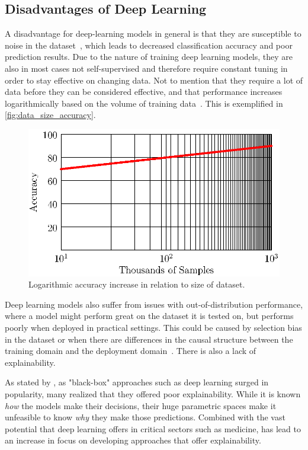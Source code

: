 \subsection{Disadvantages of Deep Learning}
A disadvantage for deep-learning models in general is that they are susceptible to noise in the dataset~\cite{noise1,noise2}, which leads to decreased classification accuracy and poor prediction results. Due to the nature of training deep learning models, they are also in most cases not self-supervised and therefore require constant tuning in order to stay effective on changing data. Not to mention that they require a lot of data before they can be considered effective, and that performance increases logarithmically based on the volume of training data~\cite{deeplearning_dataset}. This is exemplified in \autoref{fig:data_size_accuracy}.
\begin{figure}[htb]
    \centering
    \includegraphics[width=0.7\linewidth]{resources/related_works/training_volume}
    \caption[Dataset Volume Accuracy]{Logarithmic accuracy increase in relation to size of dataset.}
    \label{fig:data_size_accuracy}
\end{figure}
\par
Deep learning models also suffer from issues with out-of-distribution performance, where a model might perform great on the dataset it is tested on, but performs poorly when deployed in practical settings. This could be caused by selection bias in the dataset or when there are differences in the causal structure between the training domain and the deployment domain~\cite{deeplearning_ood}. There is also a lack of explainability.
\par
As stated by \textcite{XAI}, as "black-box" approaches such as deep learning surged in popularity, many realized that they offered poor explainability. While it is known \textit{how} the models make their decisions, their huge parametric spaces make it unfeasible to know \textit{why} they make those predictions. Combined with the vast potential that deep learning offers in critical sectors such as medicine, has lead to an increase in focus on developing approaches that offer explainability.
